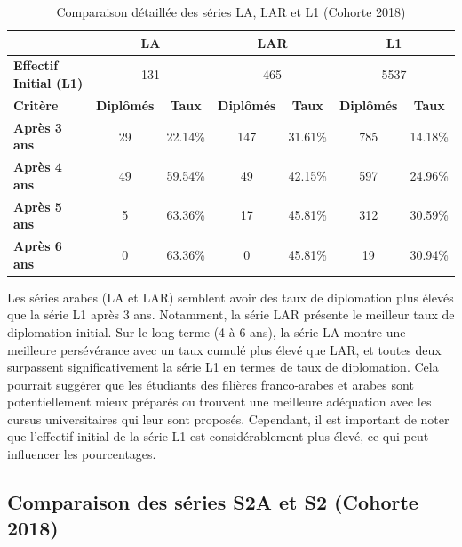 \begin{table}[htbp]
\centering
\caption{Comparaison détaillée des séries LA, LAR et L1 (Cohorte 2018)}
\begin{tabular}{l|c|c|c|c|c|c|}
\cline{2-7}
& \multicolumn{2}{c|}{\textbf{LA}} & \multicolumn{2}{c|}{\textbf{LAR}} & \multicolumn{2}{c|}{\textbf{L1}} \\
\hline
\textbf{Effectif Initial (L1)} & \multicolumn{2}{c|}{131} & \multicolumn{2}{c|}{465} & \multicolumn{2}{c|}{5537} \\
\hline
\textbf{Critère} & \textbf{Diplômés} & \textbf{Taux} & \textbf{Diplômés} & \textbf{Taux} & \textbf{Diplômés} & \textbf{Taux} \\
\hline
\textbf{Après 3 ans} & 29 & 22.14\% & 147 & 31.61\% & 785 & 14.18\% \\
\textbf{Après 4 ans} & 49 & 59.54\% & 49 & 42.15\% & 597 & 24.96\% \\
\textbf{Après 5 ans} & 5 & 63.36\% & 17 & 45.81\% & 312 & 30.59\% \\
\textbf{Après 6 ans} & 0 & 63.36\% & 0 & 45.81\% & 19 & 30.94\% \\
\hline
\end{tabular}
\end{table}

Les séries arabes (LA et LAR) semblent avoir des taux de diplomation plus élevés que la série L1 après 3 ans. 
Notamment, la série LAR présente le meilleur taux de diplomation initial. Sur le long terme (4 à 6 ans), la série LA montre une meilleure persévérance avec un taux cumulé plus élevé que LAR, et toutes deux surpassent significativement la série L1 en termes de taux de diplomation.
Cela pourrait suggérer que les étudiants des filières franco-arabes et arabes sont potentiellement mieux préparés ou trouvent une meilleure adéquation avec les cursus universitaires qui leur sont proposés. 
Cependant, il est important de noter que l'effectif initial de la série L1 est considérablement plus élevé, ce qui peut influencer les pourcentages.

\subsection{Comparaison des séries S2A et S2 (Cohorte 2018)}

